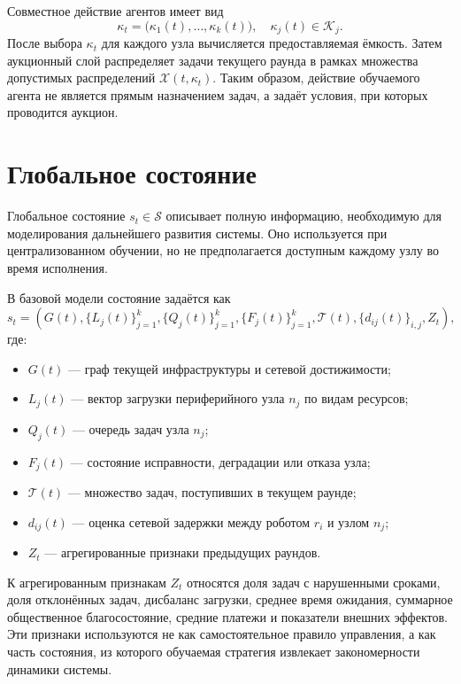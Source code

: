 Совместное действие агентов имеет вид
\begin{equation}
    \kappa_t =
    \bigl(\kappa_1(t),\ldots,\kappa_k(t)\bigr),
    \quad
    \kappa_j(t) \in \mathcal{K}_j .
    \label{eq:ch4_joint_action}
\end{equation}
После выбора $\kappa_t$ для каждого узла вычисляется предоставляемая ёмкость. Затем аукционный слой распределяет задачи текущего раунда в рамках множества допустимых распределений $\mathcal{X}(t,\kappa_t)$. Таким образом, действие обучаемого агента не является прямым назначением задач, а задаёт условия, при которых проводится аукцион.

\section{Глобальное состояние}

Глобальное состояние $s_t\in\mathcal{S}$ описывает полную информацию, необходимую для моделирования дальнейшего развития системы. Оно используется при централизованном обучении, но не предполагается доступным каждому узлу во время исполнения.

В базовой модели состояние задаётся как
\begin{equation}
    s_t =
    \left(
        G(t),
        \{L_j(t)\}_{j=1}^{k},
        \{Q_j(t)\}_{j=1}^{k},
        \{F_j(t)\}_{j=1}^{k},
        \mathcal{T}(t),
        \{d_{ij}(t)\}_{i,j},
        Z_t
    \right),
    \label{eq:ch4_state}
\end{equation}
где:
\begin{itemize}
    \item $G(t)$ --- граф текущей инфраструктуры и сетевой достижимости;
    \item $L_j(t)$ --- вектор загрузки периферийного узла $n_j$ по видам ресурсов;
    \item $Q_j(t)$ --- очередь задач узла $n_j$;
    \item $F_j(t)$ --- состояние исправности, деградации или отказа узла;
    \item $\mathcal{T}(t)$ --- множество задач, поступивших в текущем раунде;
    \item $d_{ij}(t)$ --- оценка сетевой задержки между роботом $r_i$ и узлом $n_j$;
    \item $Z_t$ --- агрегированные признаки предыдущих раундов.
\end{itemize}

К агрегированным признакам $Z_t$ относятся доля задач с нарушенными сроками, доля отклонённых задач, дисбаланс загрузки, среднее время ожидания, суммарное общественное благосостояние, средние платежи и показатели внешних эффектов. Эти признаки используются не как самостоятельное правило управления, а как часть состояния, из которого обучаемая стратегия извлекает закономерности динамики системы.

